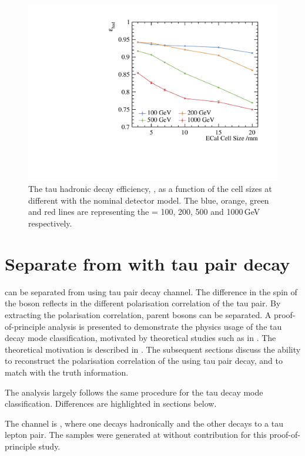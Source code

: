 \begin{figure}[htbp]
\centering %
\includegraphics[width=.45\textwidth]{tau/plots3/hadronicEff.pdf}
\caption[The tau hadronic decay efficiency as a function of  the \ECAL cell sizes at different \sqrtS with the nominal \ILD detector model.]
{The tau hadronic decay efficiency, \tauHad, as a function of  the \ECAL cell sizes at different \sqrtS with the nominal \ILD detector model. The blue, orange, green and red lines are representing the \sqrtS = 100, 200, 500 and 1000\,GeV respectively.}
\label{fig:TauHadronicEfficiency}
\end{figure}


\section{Separate \PHiggs from \PZ with tau pair decay}
\label{sec:tauHZ}
\PHiggs can be separated from  \PZ using  tau pair decay channel.  The difference in the spin of the boson reflects in the different polarisation correlation of the tau pair. By extracting the polarisation correlation, parent bosons can be separated. A proof-of-principle analysis is presented to demonstrate the physics usage of the tau decay mode classification, motivated by theoretical studies such as in \cite{Bullock:1991my}. The theoretical motivation is described in . The subsequent sections discuss the ability to reconstruct the polarisation correlation of the \PZ using tau pair decay, and to match with the truth information.

The analysis largely follows the same procedure for the tau decay mode classification. Differences are highlighted in sections below.

The channel is \HepProcess{\Pep \Pem \to \PZ \PZ}, where one \PZ decays hadronically and the other \PZ decays to a tau lepton pair. The samples were generated at  without \ISR contribution for this proof-of-principle study.

